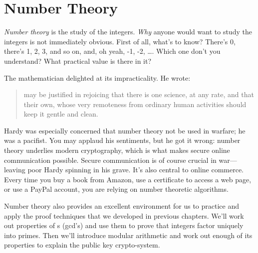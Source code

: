 \chapter{Number Theory}\label{number_theory_chap}

\emph{Number theory}%
is the study of the integers.  \emph{Why} anyone
would want to study the integers is not immediately obvious.  First of
all, what's to know?  There's 0, there's 1, 2, 3, and so on, and, oh
yeah, -1, -2, \dots.  Which one don't you understand?  What
practical value is there in it?

\iffalse Number theory is at the core of mathematics; even Ug the
Caveman surely had some grasp of the integers---at least the positive
ones.  In fact, the integers are so elementary that one might ask,
``What's to study?''  There's 0, there's 1, 2, 3 and so on, and
there's the negatives.  Which one don't you understand?  Doesn't math
become easy when we don't have to worry about nasty numbers like
$\sqrt{7}$, $1 / \pi$, and $i$?  We can even forget about fractions!
\fi

The mathematician  delighted 
at its impracticality.  He wrote:

 \begin{quotation}
  may be justified in rejoicing that there
 is one science, at any rate, and that their own, whose very
 remoteness from ordinary human activities should keep it gentle and
 clean.
 \end{quotation}

Hardy was especially concerned that number theory not be used in
warfare; he was a pacifist.  You may applaud his sentiments, but he
got it wrong: number theory underlies modern cryptography, which is
what makes secure online communication possible.  Secure communication
is of course crucial in war---leaving poor Hardy spinning in
his grave.  It's also central to online commerce.  Every time you buy
a book from Amazon, use a certificate to access a web page, or use a
PayPal account, you are relying on number theoretic algorithms.

Number theory also provides an excellent environment for us to
practice and apply the proof techniques that we developed in previous
chapters.  We'll work out properties of s
(gcd's) and use them to prove that integers factor uniquely into
primes.  Then we'll introduce modular arithmetic and work out enough
of its properties to explain the  public key crypto-system.

